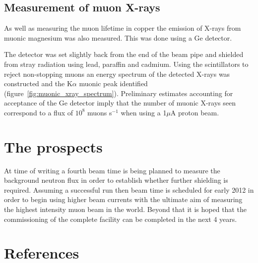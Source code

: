 \documentclass[a4paper]{jpconf}
\begin{document}
\subsection{Measurement of muon X-rays}
As well as measuring the muon lifetime in copper the emission of X-rays from muonic magnesium was also measured. This was done using a Ge detector.

The detector was set slightly back from the end of the beam pipe and shielded from stray radiation using lead, paraffin and cadmium. Using the scintillators to reject non-stopping muons an energy spectrum of the detected X-rays was constructed and the K$\alpha$ muonic peak identified (figure~\ref{fig:muonic_xray_spectrum}). Preliminary estimates accounting for acceptance of the Ge detector imply that the number of muonic X-rays seen correspond to a flux of $10^8$ muons s$^{-1}$ when using a 1$\mu$A proton beam.

\section{The prospects}
At time of writing a fourth beam time is being planned to measure the background neutron flux in order to establish whether further shielding is required. Assuming a successful run then beam time is scheduled for early 2012 in order to begin using higher beam currents with the ultimate aim of measuring the highest intensity muon beam in the world. Beyond that it is hoped that the commissioning of the complete facility can be completed in the next 4 years.
\section*{References}

\end{document}
